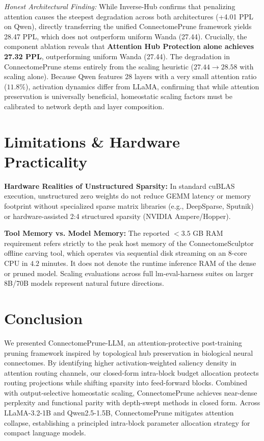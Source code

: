 \documentclass{article}
\begin{document}
\textit{Honest Architectural Finding:} While Inverse-Hub confirms that penalizing attention causes the steepest degradation across both architectures (+4.01 PPL on Qwen), directly transferring the unified ConnectomePrune framework yields 28.47 PPL, which does not outperform uniform Wanda (27.44). Crucially, the component ablation reveals that \textbf{Attention Hub Protection alone achieves 27.32 PPL}, outperforming uniform Wanda (27.44). The degradation in ConnectomePrune stems entirely from the scaling heuristic ($27.44 \to 28.58$ with scaling alone). Because Qwen features 28 layers with a very small attention ratio ($11.8\%$), activation dynamics differ from LLaMA, confirming that while attention preservation is universally beneficial, homeostatic scaling factors must be calibrated to network depth and layer composition.

\section{Limitations \& Hardware Practicality}
\textbf{Hardware Realities of Unstructured Sparsity:} In standard cuBLAS execution, unstructured zero weights do not reduce GEMM latency or memory footprint without specialized sparse matrix libraries (e.g., DeepSparse, Sputnik) or hardware-assisted 2:4 structured sparsity (NVIDIA Ampere/Hopper).

\textbf{Tool Memory vs. Model Memory:} The reported $< 3.5$ GB RAM requirement refers strictly to the peak host memory of the ConnectomeSculptor offline carving tool, which operates via sequential disk streaming on an 8-core CPU in $4.2$ minutes. It does not denote the runtime inference RAM of the dense or pruned model. Scaling evaluations across full lm-eval-harness suites on larger 8B/70B models represent natural future directions.

\section{Conclusion}
We presented ConnectomePrune-LLM, an attention-protective post-training pruning framework inspired by topological hub preservation in biological neural connectomes. By identifying higher activation-weighted saliency density in attention routing channels, our closed-form intra-block budget allocation protects routing projections while shifting sparsity into feed-forward blocks. Combined with output-selective homeostatic scaling, ConnectomePrune achieves near-dense perplexity and functional parity with depth-swept methods in closed form. Across LLaMA-3.2-1B and Qwen2.5-1.5B, ConnectomePrune mitigates attention collapse, establishing a principled intra-block parameter allocation strategy for compact language models.



\end{document}
